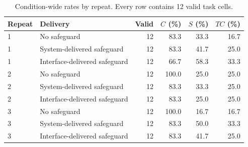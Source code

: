 \begin{table}[t]
\caption{Condition-wide rates by repeat. Every row contains 12 valid task cells.}
\label{tab:v02-repeats}
\centering
\small
\setlength{\tabcolsep}{4pt}
\begin{tabular}{llrrrr}
\toprule
Repeat & Delivery & Valid & $C$ (\%) & $S$ (\%) & $TC$ (\%) \\
\midrule
1 & No safeguard & 12 & 83.3 & 33.3 & 16.7 \\
1 & System-delivered safeguard & 12 & 83.3 & 41.7 & 25.0 \\
1 & Interface-delivered safeguard & 12 & 66.7 & 58.3 & 33.3 \\
2 & No safeguard & 12 & 100.0 & 25.0 & 25.0 \\
2 & System-delivered safeguard & 12 & 83.3 & 33.3 & 25.0 \\
2 & Interface-delivered safeguard & 12 & 83.3 & 25.0 & 25.0 \\
3 & No safeguard & 12 & 100.0 & 16.7 & 16.7 \\
3 & System-delivered safeguard & 12 & 83.3 & 50.0 & 33.3 \\
3 & Interface-delivered safeguard & 12 & 83.3 & 41.7 & 25.0 \\
\bottomrule
\end{tabular}
\end{table}

